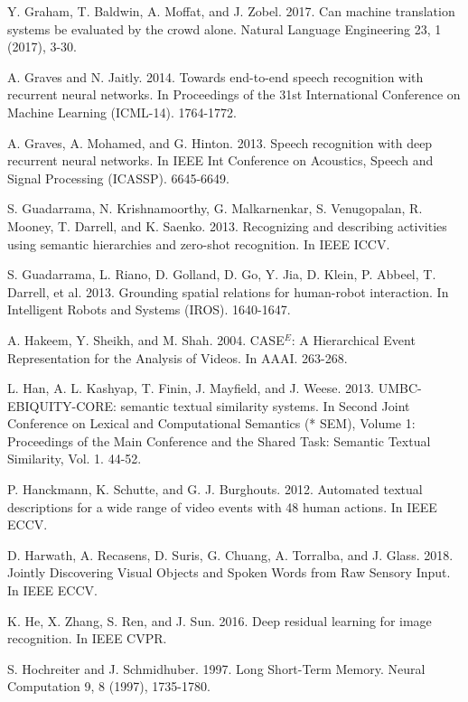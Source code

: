 \documentclass[10pt,journal,compsoc]{IEEEtran}
\begin{document}
\begin{thebibliography}{1}
Y. Graham, T. Baldwin, A. Moffat, and J. Zobel. 2017. Can machine translation systems be evaluated by the crowd alone. Natural Language Engineering 23, 1 (2017), 3-30.

A. Graves and N. Jaitly. 2014. Towards end-to-end speech recognition with recurrent neural networks. In Proceedings of the 31st International Conference on Machine Learning (ICML-14). 1764-1772.

A. Graves, A. Mohamed, and G. Hinton. 2013. Speech recognition with deep recurrent neural networks. In IEEE Int Conference on Acoustics, Speech and Signal Processing (ICASSP). 6645-6649.

S. Guadarrama, N. Krishnamoorthy, G. Malkarnenkar, S. Venugopalan, R. Mooney, T. Darrell, and K. Saenko. 2013. Recognizing and describing activities using semantic hierarchies and zero-shot recognition. In IEEE ICCV. %

S. Guadarrama, L. Riano, D. Golland, D. Go, Y. Jia, D. Klein, P. Abbeel, T. Darrell, et al. 2013. Grounding spatial relations for human-robot interaction. In Intelligent Robots and Systems (IROS). 1640-1647.

A. Hakeem, Y. Sheikh, and M. Shah. 2004.  CASE$^E$: A Hierarchical Event Representation for the Analysis of Videos. In AAAI. 263-268.

L. Han, A. L. Kashyap, T. Finin, J. Mayfield, and J. Weese. 2013. UMBC-EBIQUITY-CORE: semantic textual similarity systems. In Second Joint Conference on Lexical and Computational Semantics (* SEM), Volume 1: Proceedings of the Main Conference and the Shared Task: Semantic Textual Similarity, Vol. 1. 44-52.

P. Hanckmann, K. Schutte, and G. J. Burghouts. 2012. Automated textual descriptions for a wide range of video events with 48 human actions. In IEEE ECCV. %

D. Harwath, A. Recasens, D. Suris, G. Chuang,
A. Torralba, and J. Glass. 2018. Jointly Discovering Visual Objects and Spoken Words from Raw Sensory Input. In IEEE ECCV. 


K. He, X. Zhang, S. Ren, and J. Sun. 2016. Deep residual learning for image recognition. In IEEE CVPR. %

S. Hochreiter and J. Schmidhuber. 1997. Long Short-Term Memory. Neural Computation 9, 8 (1997), 1735-1780.


\end{thebibliography}
\end{document}
